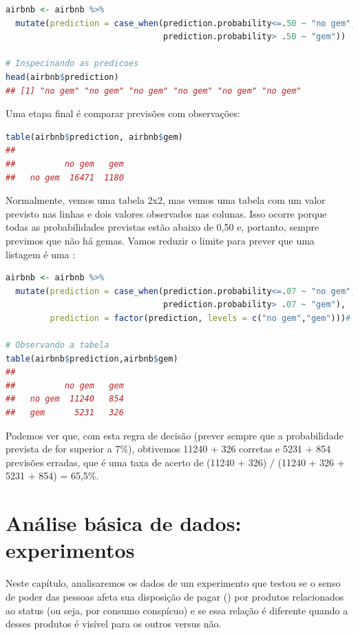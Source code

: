 \documentclass{article}
\begin{document}
\begin{lstlisting}[language=R]
airbnb <- airbnb %>% 
  mutate(prediction = case_when(prediction.probability<=.50 ~ "no gem",
                                prediction.probability> .50 ~ "gem"))

# Inspecinando as predicoes
head(airbnb$prediction)
## [1] "no gem" "no gem" "no gem" "no gem" "no gem" "no gem"

\end{lstlisting}

Uma etapa final é comparar previsões com observações:

\begin{lstlisting}[language=R]
table(airbnb$prediction, airbnb$gem)
##         
##          no gem   gem
##   no gem  16471  1180
\end{lstlisting}

Normalmente, vemos uma tabela 2x2, mas vemos uma tabela com um valor previsto nas linhas e dois valores observados nas colunas. Isso ocorre porque todas as probabilidades previstas estão abaixo de 0,50 e, portanto, sempre previmos que não há gemas. Vamos reduzir o limite para prever que uma listagem é uma :

\begin{lstlisting}[language=R]
airbnb <- airbnb %>% 
  mutate(prediction = case_when(prediction.probability<=.07 ~ "no gem",
                                prediction.probability> .07 ~ "gem"),
         prediction = factor(prediction, levels = c("no gem","gem")))# verifique se nenhuma joia eh o primeiro nivel do nosso fator

# Observando a tabela
table(airbnb$prediction,airbnb$gem)
##         
##          no gem   gem
##   no gem  11240   854
##   gem      5231   326

\end{lstlisting}

Podemos ver que, com esta regra de decisão (prever  sempre que a probabilidade prevista de  for superior a 7\%), obtivemos 11240 + 326 corretas e 5231 + 854 previsões erradas, que é uma taxa de acerto de (11240 + 326) / (11240 + 326 + 5231 + 854) = 65,5\%.

\newpage
\section{Análise básica de dados: experimentos}

Neste capítulo, analisaremos os dados de um experimento que testou se o senso de poder das pessoas afeta sua disposição de pagar () por produtos relacionados ao status (ou seja, por consumo conspícuo) e se essa relação é diferente quando a  desses produtos é visível para os outros versus não.
\end{document}
